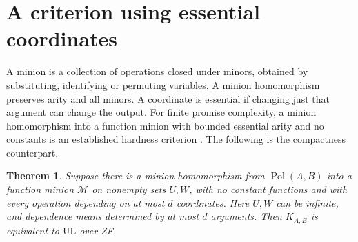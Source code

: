 \documentclass[11pt]{article}
\newtheorem{theorem}{Theorem}
\newcommand{\Pol}{\operatorname{Pol}}
\newcommand{\UL}{\mathrm{UL}}
\begin{document}
\section{A criterion using essential coordinates}
A minion is a collection of operations closed under minors, obtained by substituting, identifying or permuting variables. A minion homomorphism preserves arity and all minors. A coordinate is essential if changing just that argument can change the output. For finite promise complexity, a minion homomorphism into a function minion with bounded essential arity and no constants is an established hardness criterion \cite{bbko}. The following is the compactness counterpart.

\begin{theorem}\label{essential}
Suppose there is a minion homomorphism from $\Pol(A,B)$ into a function minion $\mathcal M$ on nonempty sets $U,W$, with no constant functions and with every operation depending on at most $d$ coordinates. Here $U,W$ can be infinite, and dependence means determined by at most $d$ arguments. Then $K_{A,B}$ is equivalent to $\UL$ over ZF.
\end{theorem}
\end{document}
